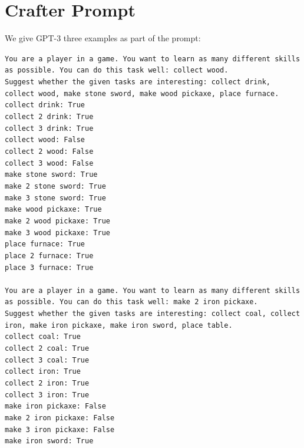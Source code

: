 \documentclass{article} %
\begin{document}
\section{Crafter Prompt}
\label{app:prompt-crafter}
We give GPT-3 three examples as part of the prompt:

\texttt{You are a player in a game. You want to learn as many different skills as possible. You can do this task well: collect wood.\\
Suggest whether the given tasks are interesting: collect drink, collect wood, make stone sword, make wood pickaxe, place furnace.\\
collect drink: True\\
collect 2 drink: True\\
collect 3 drink: True\\
collect wood: False\\
collect 2 wood: False\\
collect 3 wood: False\\
make stone sword: True\\
make 2 stone sword: True\\
make 3 stone sword: True\\
make wood pickaxe: True\\
make 2 wood pickaxe: True\\
make 3 wood pickaxe: True\\
place furnace: True\\
place 2 furnace: True\\
place 3 furnace: True\\\\
You are a player in a game. You want to learn as many different skills as possible. You can do this task well: make 2 iron pickaxe.\\
Suggest whether the given tasks are interesting: collect coal, collect iron, make iron pickaxe, make iron sword, place table.\\
collect coal: True\\
collect 2 coal: True\\
collect 3 coal: True\\
collect iron: True\\
collect 2 iron: True\\
collect 3 iron: True\\
make iron pickaxe: False\\
make 2 iron pickaxe: False\\
make 3 iron pickaxe: False\\
make iron sword: True\\
}
\end{document}
